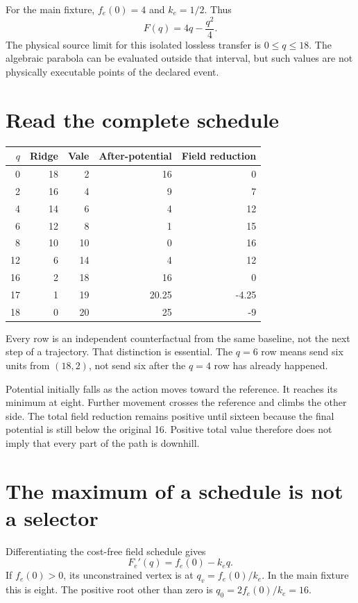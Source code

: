 For the main fixture, \(f_e(0)=4\) and \(k_e=1/2\). Thus
\begin{equation}\label{eq:main-finite-schedule}
 F(q)=4q-\frac{q^2}{4}.
\end{equation}
The physical source limit for this isolated lossless transfer is \(0\leq q\leq18\). The algebraic parabola can be evaluated outside that interval, but such values are not physically executable points of the declared event.

\section{Read the complete schedule}
\begin{center}
\begin{tabular}{rrrrr}
\toprule
\(q\) & Ridge & Vale & After-potential & Field reduction\\
\midrule
0 & 18 & 2 & 16 & 0\\
2 & 16 & 4 & 9 & 7\\
4 & 14 & 6 & 4 & 12\\
6 & 12 & 8 & 1 & 15\\
8 & 10 & 10 & 0 & 16\\
12 & 6 & 14 & 4 & 12\\
16 & 2 & 18 & 16 & 0\\
17 & 1 & 19 & 20.25 & -4.25\\
18 & 0 & 20 & 25 & -9\\
\bottomrule
\end{tabular}
\end{center}
Every row is an independent counterfactual from the same baseline, not the next step of a trajectory. That distinction is essential. The \(q=6\) row means send six units from \((18,2)\), not send six after the \(q=4\) row has already happened.

Potential initially falls as the action moves toward the reference. It reaches its minimum at eight. Further movement crosses the reference and climbs the other side. The total field reduction remains positive until sixteen because the final potential is still below the original 16. Positive total value therefore does not imply that every part of the path is downhill.

\section{The maximum of a schedule is not a selector}
Differentiating the cost-free field schedule gives
\begin{equation}
 F_e'(q)=f_e(0)-k_e q.
\end{equation}
If \(f_e(0)>0\), its unconstrained vertex is at \(q_v=f_e(0)/k_e\). In the main fixture this is eight. The positive root other than zero is \(q_0=2f_e(0)/k_e=16\).

